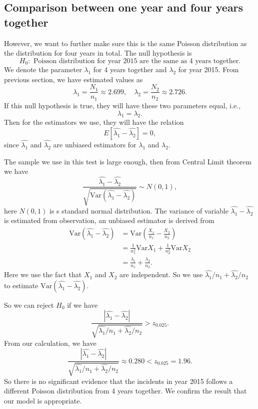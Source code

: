 \documentclass[11pt,a4paper,english]{article}
\begin{document}
\subsection{Comparison between one year and four years together}
However, we want to further make sure this is the same Poisson distribution as the distribution for four years in total. The null hypothesis is 
\[H_{0}:\text{ Poisson distribution for year 2015 are the same as 4 years together.}\]
We denote the parameter $\lambda_{1}$ for 4 years together and $\lambda_{2}$ for year 2015. From previous section, we have estimated values as
\[\lambda_{1} = \frac{N_{1}}{n_{1}} \approx 2.699,\quad \lambda_{2} = \frac{N_{2}}{n_{2}} \approx 2.726.\]
If this null hypothesis is true, they will have these two parameters equal, i.e.,
\begin{equation*}
	\lambda_{1} = \lambda_{2}.
\end{equation*}
Then for the estimators we use, they will have the relation
\begin{equation*}
	E[\hat{\lambda_{1}}-\hat{\lambda_{2}}] = 0,
\end{equation*}
since $\hat{\lambda_{1}}$ and $\hat{\lambda_{2}}$ are unbiased estimators for $\lambda_{1}$ and $\lambda_{2}$.

The sample we use in this test is large enough, then from Central Limit theorem \cite{slides} we have
\begin{equation*}
	\frac{\hat{\lambda_{1}} - \hat{\lambda_{2}}}{\sqrt{\text{Var}\left(\hat{\lambda_{1}} - \hat{\lambda_{2}}\right)}}
	\sim N(0, 1),
\end{equation*}
here $N(0,1)$ is s standard normal distribution.
The variance of variable $\hat{\lambda_{1}}-\hat{\lambda_{2}}$ is estimated from observation, an unbiased estimator is derived from
\begin{align*}
	\text{Var}\left(\hat{\lambda_{1}} - \hat{\lambda_{2}}\right)
	&= \text{Var}\left(\frac{X_{1}}{n_{1}} - \frac{X_{2}}{n_{2}}\right) \\
	&= \frac{1}{n_{1}^{2}}\text{Var} X_{1}
	+ \frac{1}{n_{2}^{2}}\text{Var} X_{2} \\
	&= \frac{\lambda_{1}}{n_{1}} + \frac{\lambda_{2}}{n_{2}}.
\end{align*}
Here we use the fact that $X_{1}$ and $X_{2}$ are independent. So we use $\hat{\lambda_{1}}/{n_{1}} + \hat{\lambda_{2}}/{n_{2}}$ to estimate $\text{Var}\left(\hat{\lambda_{1}}-\hat{\lambda_{2}}\right)$.

So we can reject $H_{0}$ if we have 
\[\frac{|\hat{\lambda_{1}}-\hat{\lambda_{2}}|}{\sqrt{\hat{\lambda_{1}}/{n_{1}} + \hat{\lambda_{2}}/{n_{2}}}} > z_{0.025}.\]
From our calculation, we have 
\begin{equation*}
	\frac{|\hat{\lambda_{1}}-\hat{\lambda_{2}}|}{\sqrt{\hat{\lambda_{1}}/{n_{1}} + \hat{\lambda_{2}}/{n_{2}}}} \approx 0.280 < z_{0.025} = 1.96.
\end{equation*}
So there is no significant evidence that the incidents in year 2015 follows a different Poisson distribution from 4 years together. We confirm the result that our model is appropriate.
\end{document}
